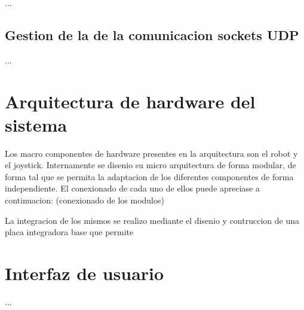 ...


\subsection{Gestion de la  de la comunicacion sockets UDP}


...



\section{Arquitectura de hardware del sistema}

Los macro componentes de hardware presentes en la arquitectura son el robot y el joystick.
Internamente se disenio su micro arquitectura de forma modular, de forma tal que se permita la adaptacion de los diferentes componentes de forma independiente.
El conexionado de cada uno de ellos puede apreciase a continuacion:
(conexionado de los modulos)

La integracion de los mismos se realizo mediante el disenio y contruccion de una placa integradora base que permite

\section{Interfaz de usuario}

...



